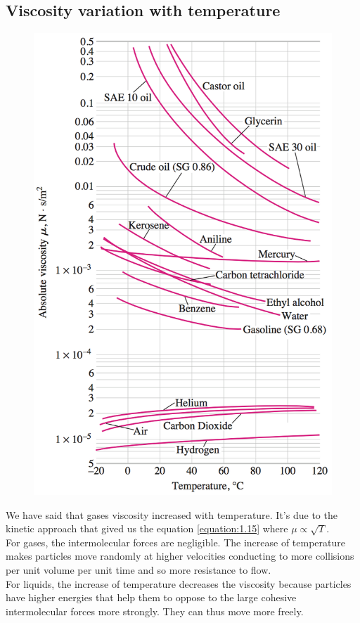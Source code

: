 \subsection{Viscosity variation with temperature}
\label{subsec:viscogas}
\begin{figure}
	\vspace{-10mm}
	\includegraphics[scale=0.25]{ch1/10}
\end{figure}
We have said that gases viscosity increased with temperature. It's due to the kinetic approach that gived us the equation \eqref{equation:1.15} where $\mu \propto \sqrt{T}$. \\
For gases, the intermolecular forces are negligible. The increase of temperature makes particles move randomly at higher velocities conducting to more collisions per unit volume per unit time and so more resistance to flow. \\
For liquids, the increase of temperature decreases the viscosity because particles have higher energies that help them to oppose to the large cohesive intermolecular forces more strongly. They can thus move more freely. 

